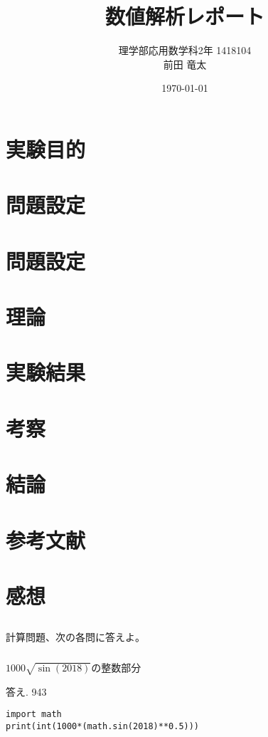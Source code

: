\documentclass[12pt,a4paper]{jsarticle}
\begin{document}
\begin{titlepage}
\title{数値解析レポート}
\author{理学部応用数学科2年 $$1418104 \\前田 竜太}
\date{\today}
\maketitle
\end{titlepage}

\section{実験目的}
\section{問題設定}
\section{問題設定}
\section{理論}
\section{実験結果}
\section{考察}
\section{結論}
\section{参考文献}
\section{感想}






\subsection{}
計算問題、次の各問に答えよ。
\subsubsection{}
$1000\sqrt{\sin(2018)}$の整数部分\par
答え. 943
\begin{lstlisting}
import math
print(int(1000*(math.sin(2018)**0.5)))
\end{lstlisting}
\end{document}
